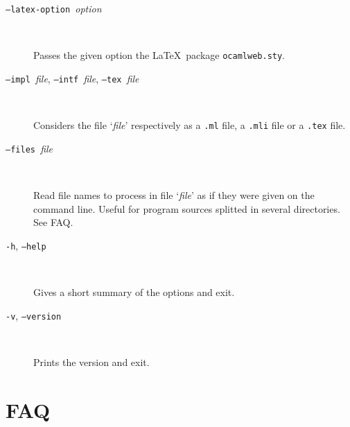 \documentclass[12pt]{article}
\begin{document}
\begin{description}
\item[\texttt{--latex-option }\textit{option}] ~\par

  Passes the given option the \LaTeX\ package \texttt{ocamlweb.sty}. 

\item[\texttt{--impl }\textit{file}, \texttt{--intf }\textit{file}, 
      \texttt{--tex }\textit{file}] ~\par

  Considers the file `\textit{file}' respectively as a \verb!.ml! file, a
  \verb!.mli! file or a \verb!.tex! file.

\item[\texttt{--files }\textit{file}] ~\par

  Read file names to process in file `\textit{file}' as if they were
  given on the command line. Useful for program sources splitted in
  several directories. See FAQ.
  
\item[\texttt{-h}, \texttt{--help}] ~\par

  Gives a short summary of the options and exit.

\item[\texttt{-v}, \texttt{--version}] ~\par

  Prints the version and exit.

\end{description}


\section{FAQ}
\end{document}
